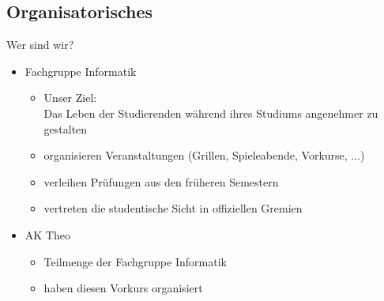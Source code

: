 \subsection{Organisatorisches}
\begin{frame}[fragile]{Wer sind wir?}
    \begin{itemize}
        \item 
            Fachgruppe Informatik
            \begin{itemize}
                \item Unser Ziel: \\
                Das Leben der Studierenden während ihres Studiums angenehmer zu gestalten
                \item organisieren Veranstaltungen (Grillen, Spieleabende, Vorkurse, ...)
                \item verleihen Prüfungen aus den früheren Semestern
                \item vertreten die studentische Sicht in offiziellen Gremien
            \end{itemize}
        \item AK Theo
        \begin{itemize}
            \item Teilmenge der Fachgruppe Informatik
            \item haben diesen Vorkurs organisiert
        \end{itemize}
    \end{itemize}
\end{frame}

